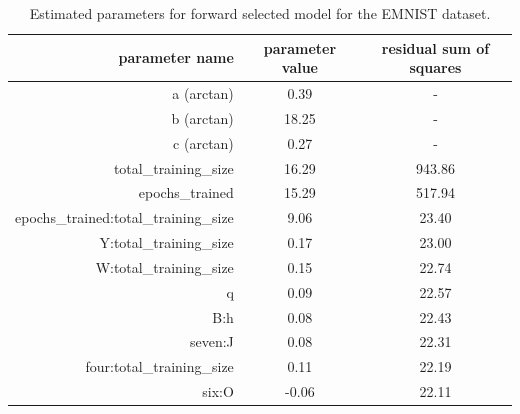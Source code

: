 \documentclass{article} %
\begin{document}
\begin{table}[h!]
    \centering
\begin{tabular}{r|c|c}

    parameter name &  parameter value &    residual sum of squares \\
    \hline
    a (arctan)                                  &         0.39 &    -    \\
    b (arctan)                                  &        18.25 &    -    \\
    c (arctan)                                  &         0.27 &    -    \\
    total\_training\_size                &        16.29 & 943.86 \\
    epochs\_trained                     &        15.29 & 517.94 \\
    epochs\_trained:total\_training\_size &         9.06 &  23.40 \\
    Y:total\_training\_size              &         0.17 &  23.00 \\
    W:total\_training\_size              &         0.15 &  22.74 \\
    q                                  &         0.09 &  22.57 \\
    B:h                                &         0.08 &  22.43 \\
    seven:J                            &         0.08 &  22.31 \\
    four:total\_training\_size           &         0.11 &  22.19 \\
    six:O                              &        -0.06 &  22.11 \\
    \end{tabular}
\caption{Estimated parameters for forward selected model for the EMNIST dataset.}
\label{table:param_values_emnist}
\end{table}
\end{document}
